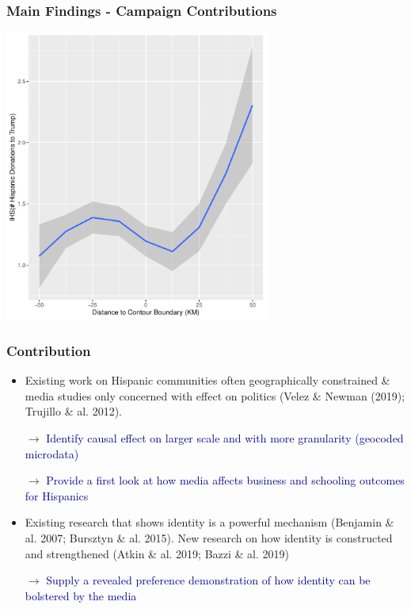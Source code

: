 \documentclass{beamer}
\begin{document}
\begin{frame}
\frametitle{Main Findings - Campaign Contributions}
\centering
        \includegraphics[width=0.65\textwidth]{../../analysis/Output/graphs/hispanictrump.pdf}\\
\end{frame}


\begin{frame}
\frametitle{Contribution}
\begin{itemize}

\item Existing work on Hispanic communities often geographically constrained \& media studies only concerned with effect on politics  {\footnotesize (Velez \& Newman (2019); Trujillo \& al. 2012)}. 
\item[$\rightarrow $] \textcolor{darkblue}{Identify causal effect on larger scale and with more granularity (geocoded microdata)}

\item[$\rightarrow $] \textcolor{darkblue}{Provide a first look at how media affects business and schooling outcomes for Hispanics}

\item Existing research that shows identity is a powerful mechanism {\footnotesize (Benjamin \& al. 2007; Bursztyn \& al. 2015)}. New research on how identity is constructed and strengthened {\footnotesize (Atkin \& al. 2019; Bazzi \& al. 2019)}

\item[$\rightarrow $] \textcolor{darkblue}{Supply a revealed preference demonstration of how identity can be bolstered by the media}

\end{itemize}

\end{frame}
\end{document}
